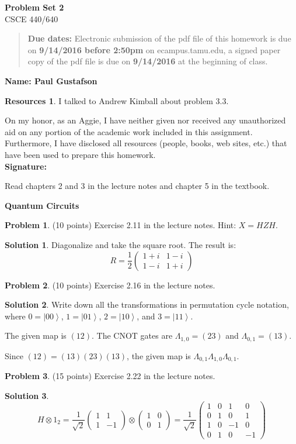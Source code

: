 \documentclass{article}
\theoremstyle{definition}
\newtheorem{problem}{Problem}
\newtheorem*{solution}{Solution}
\newtheorem*{resources}{Resources}
\newcommand{\name}[1]{\noindent\textbf{Name: #1}}
\newcommand{\honor}{\noindent On my honor, as an Aggie, I have neither
  given nor received any unauthorized aid on any portion of the
  academic work included in this assignment. Furthermore, I have
  disclosed all resources (people, books, web sites, etc.) that have
  been used to prepare this homework. \\[1ex]
 \textbf{Signature:} \underline{\hspace*{5cm}} }
\newcommand{\problemset}[1]{\begin{center}\textbf{Problem Set #1}\\ 
CSCE 440/640\end{center}}
\newcommand{\duedate}[2]{\begin{quote}\textbf{Due dates:} Electronic
    submission of the pdf file of this homework is due on \textbf{#1} on ecampus.tamu.edu, a signed paper copy
    of the pdf file is due on \textbf{#2} at the beginning of
    class. \end{quote} }
\begin{document}
\problemset{2}
\duedate{9/14/2016 before 2:50pm}{9/14/2016}
\name{ Paul Gustafson }
\begin{resources} I talked to Andrew Kimball about problem 3.3.
\end{resources}
\honor

\newpage

\noindent Read chapters 2 and 3 in the lecture notes and chapter 5 in the textbook. \medskip

\noindent\textbf{Quantum Circuits}
\begin{problem} (10 points)
Exercise 2.11 in the lecture notes. Hint: $X=HZH$. 
\end{problem}
\begin{solution}
Diagonalize and take the square root. The result is:
$$R = 
\frac{1}{2} \begin{pmatrix}
 1 + i & 1 - i \\
1 - i & 1 + i
\end{pmatrix}
$$
\end{solution}

\begin{problem} (10 points)
Exercise 2.16 in the lecture notes. 
\end{problem}
\begin{solution}
Write down all the transformations in permutation cycle notation,
where $0 = \left|00 \right\rangle$, $1 = \left|01 \right\rangle$,
$2 = \left|10 \right\rangle$, and $3 = \left| 11 \right\rangle$.

The given map is $(12)$.  The CNOT gates are 
$\Lambda_{1,0} = (23)$ and $\Lambda_{0,1} = (13)$.

Since $(12) = (13) (23) (13)$, the given map is
$\Lambda_{0,1}\Lambda_{1,0}\Lambda_{0,1}$.
\end{solution}

\begin{problem} (15 points)
Exercise 2.22 in the lecture notes.
\end{problem}
\begin{solution}
$$
H \otimes 1_2 = \frac{1}{\sqrt 2} 
\begin{pmatrix}
1 & 1 \\
1 & -1
\end{pmatrix} \otimes  
\begin{pmatrix}
1 & 0 \\
0 & 1
\end{pmatrix}
= \frac{1}{\sqrt 2}
\begin{pmatrix}
1 & 0 & 1 & 0 \\
0 & 1 & 0 & 1 \\
1 & 0 & -1 & 0 \\
0 & 1 & 0 & -1 
\end{pmatrix}
$$ 
\end{solution}
\end{document}
